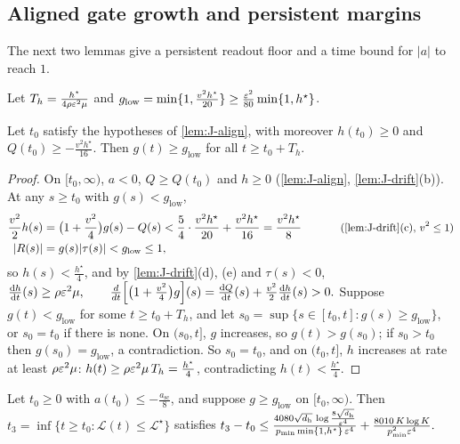 \subsection{Aligned gate growth and persistent margins}

The next two lemmas give a persistent readout floor and a time bound for $|a|$ to reach $1$.

Let $T_h=\frac{h^\star}{4\rho\varepsilon^2\mu}$ and $g_{\mathrm{low}}=\min\{1,\frac{v^2h^\star}{20}\}\ge\frac{\varepsilon^2}{80}\min\{1,h^\star\}$.

\begin{lemma}
\label{lem:J-floor}
Let $t_0$ satisfy the hypotheses of \cref{lem:J-align}, with moreover $h(t_0)\ge0$ and $Q(t_0)\ge-\frac{v^2h^\star}{16}$. Then $g(t)\ge g_{\mathrm{low}}$ for all
$t\ge t_0+T_h$.
\end{lemma}

\begin{proof}
On $[t_0,\infty)$, $a<0$, $Q\ge Q(t_0)$ and $h\ge0$ (\cref{lem:J-align}, \cref{lem:J-drift}(b)). At any $s\ge t_0$ with $g(s)<g_{\mathrm{low}}$,
\begin{alignat*}{2}
 \tfrac{v^2}{2}h(s)&=\bigl(1+\tfrac{v^2}{4}\bigr)g(s)-Q(s)<\tfrac{5}{4}\cdot\tfrac{v^2h^\star}{20}+\tfrac{v^2h^\star}{16}=\tfrac{v^2h^\star}{8} &\qquad& \why{\cref{lem:J-drift}(c), $v^2\le1$}\\
 |R(s)|&=g(s)|\tau(s)|<g_{\mathrm{low}}\le1,
\end{alignat*}
so $h(s)<\frac{h^\star}{4}$, and by \cref{lem:J-drift}(d), (e) and $\tau(s)<0$,
 $\ddt{h}(s)\ge\rho\initscale^2\mu,\qquad \frac{d}{dt}\Bigl[\bigl(1+\tfrac{v^2}{4}\bigr)g\Bigr](s)=\ddt{Q}(s)+\tfrac{v^2}{2}\ddt{h}(s)>0 .$ 
Suppose $g(t)<g_{\mathrm{low}}$ for some $t\ge t_0+T_h$, and let $s_0=\sup\{s\in[t_0,t]:g(s)\ge g_{\mathrm{low}}\}$, or $s_0=t_0$ if there is none. On $(s_0,t]$, $g$
increases, so $g(t)>g(s_0)$; if $s_0>t_0$ then $g(s_0)=g_{\mathrm{low}}$, a contradiction. So $s_0=t_0$, and on $(t_0,t]$, $h$ increases at rate at least
$\rho\varepsilon^2\mu$: $h(t)\ge\rho\varepsilon^2\mu\,T_h=\frac{h^\star}{4}$, contradicting $h(t)<\frac{h^\star}{4}$.
\end{proof}

\begin{lemma}
\label{lem:J-grow}
Let $t_0\ge0$ with $a(t_0)\le-\frac{a_{\mathrm{sc}}}{8}$, and suppose $g\ge g_{\mathrm{low}}$ on $[t_0,\infty)$. Then $t_3=\inf\{t\ge t_0:\mathcal L(t)\le\mathcal L^\star\}$ satisfies
 $t_3-t_0\le\frac{4080\sqrt{d_{\mathrm h}}\,\log\frac{8\sqrt{d_{\mathrm h}}}{\varepsilon^4}}{p_{\min}\min\{1,h^\star\}\,\varepsilon^4}+\frac{8010\,K\log K}{p_{\min}^2\varepsilon^4} .$ 
\end{lemma}

